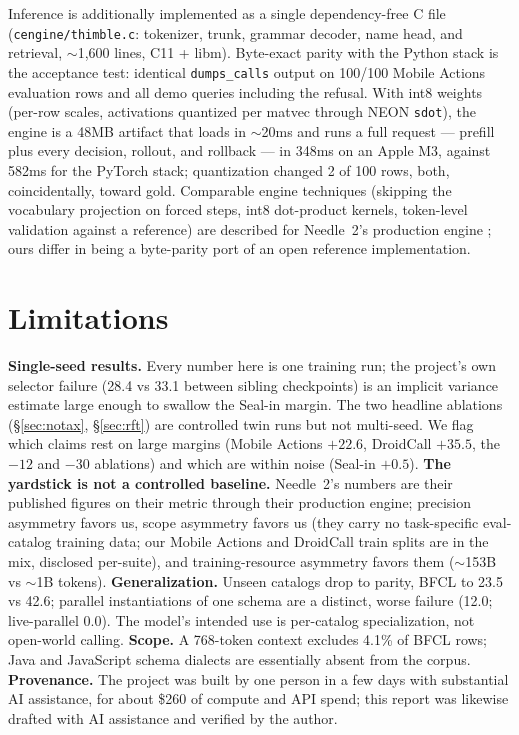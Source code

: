 \documentclass[10pt]{article}
\newcommand{\needle}{Needle~2}
\begin{document}
Inference is additionally implemented as a single dependency-free C file
(\texttt{cengine/thimble.c}: tokenizer, trunk, grammar decoder, name head,
and retrieval, $\sim$1{,}600 lines, C11 + libm). Byte-exact parity with the
Python stack is the acceptance test: identical \texttt{dumps\_calls} output on
100/100 Mobile Actions evaluation rows and all demo queries including the
refusal. With int8 weights (per-row scales, activations quantized per matvec
through NEON \texttt{sdot}), the engine is a 48MB artifact that loads in
$\sim$20ms and runs a full request --- prefill plus every decision, rollout,
and rollback --- in 348ms on an Apple M3, against 582ms for the PyTorch stack;
quantization changed 2 of 100 rows, both, coincidentally, toward gold.
Comparable engine techniques (skipping the vocabulary projection on forced
steps, int8 dot-product kernels, token-level validation against a reference)
are described for \needle{}'s production engine \citep{needle2}; ours differ
in being a byte-parity port of an open reference implementation.

\section{Limitations}
\label{sec:limitations}

\textbf{Single-seed results.} Every number here is one training run; the
project's own selector failure (28.4 vs 33.1 between sibling checkpoints)
is an implicit variance estimate large enough to swallow the Seal-in margin.
The two headline ablations (\S\ref{sec:notax}, \S\ref{sec:rft}) are
controlled twin runs but not multi-seed. We flag which claims rest on large
margins (Mobile Actions $+22.6$, DroidCall $+35.5$, the $-12$ and $-30$
ablations) and which are within noise (Seal-in $+0.5$).
\textbf{The yardstick is not a controlled baseline.} \needle{}'s numbers are
their published figures on their metric through their production engine;
precision asymmetry favors us, scope asymmetry favors us (they carry no
task-specific eval-catalog training data; our Mobile Actions and DroidCall
train splits are in the mix, disclosed per-suite), and training-resource
asymmetry favors them ($\sim$153B vs $\sim$1B tokens).
\textbf{Generalization.} Unseen catalogs drop to parity, BFCL to 23.5 vs
42.6; parallel instantiations of one schema are a distinct, worse failure
(12.0; live-parallel 0.0). The model's intended use is per-catalog
specialization, not open-world calling.
\textbf{Scope.} A 768-token context excludes 4.1\% of BFCL rows; Java and
JavaScript schema dialects are essentially absent from the corpus.
\textbf{Provenance.} The project was built by one person in a few days with
substantial AI assistance, for about \$260 of compute and API spend; this
report was likewise drafted with AI assistance and verified by the author.
\end{document}
